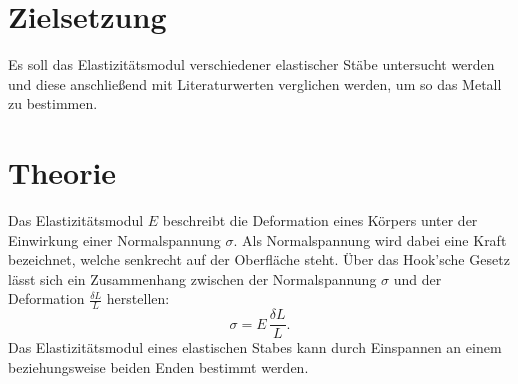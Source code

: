 \section{Zielsetzung}
    Es soll das Elastizitätsmodul verschiedener elastischer Stäbe untersucht werden und diese anschließend 
    mit Literaturwerten verglichen werden, um so das Metall zu bestimmen.
\section{Theorie}
\label{sec:theorie}
    Das Elastizitätsmodul $E$ beschreibt die Deformation eines Körpers unter der Einwirkung einer Normalspannung $\sigma$. Als Normalspannung wird dabei eine Kraft
    bezeichnet, welche senkrecht auf der Oberfläche steht. Über das Hook'sche Gesetz lässt sich ein Zusammenhang zwischen der Normalspannung $\sigma$ und
    der Deformation $\frac{\delta L}{L}$ herstellen:
    \begin{equation}
    \label{eqn:hook}
        \sigma = E \, \frac{\delta L}{L}.
    \end{equation}
    Das Elastizitätsmodul eines elastischen Stabes kann durch Einspannen an einem beziehungsweise beiden Enden bestimmt werden.
